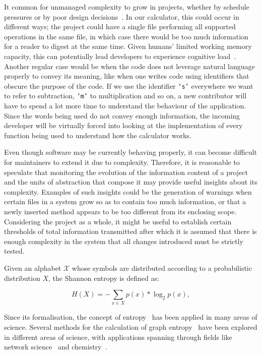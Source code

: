\documentclass[10pt,conference]{IEEEtran}
\begin{document}
It common for unmanaged complexity to grow in projects, whether by schedule pressures or by poor design decisions~\cite{mcconnel2018techdebt}. In our calculator, this could occur in different ways; the project could have a single file performing all supported operations in the same file, in which case there would be too much information for a reader to digest at the same time. Given humans' limited working memory capacity, this can potentially lead developers to experience cognitive load~\cite{kalyuga2011cognitive}. Another regular case would be when the code does not leverage natural language properly to convey its meaning, like when one writes code using identifiers that obscure the purpose of the code. If we use the identifier \texttt{`s'} everywhere we want to refer to subtraction, \texttt{`m'} to multiplication and so on, a new contributor will have to spend a lot more time to understand the behaviour of the application. Since the words being used do not convey enough information, the incoming developer will be virtually forced into looking at the implementation of every function being used to understand how the calculator works.

Even though software may be currently behaving properly, it can become difficult for maintainers to extend it due to complexity. Therefore, it is reasonable to speculate that monitoring the evolution of the information content of a project and the units of abstraction that compose it may provide useful insights about its complexity. Examples of such insights could be the generation of warnings when certain files in a system grow so as to contain too much information, or that a newly inserted method appears to be too different from its enclosing scope. Considering the project as a whole, it might be useful to establish certain thresholds of total information transmitted after which it is assumed that there is enough complexity in the system that all changes introduced must be strictly tested.

Given an alphabet $\mathcal{X}$ whose symbols are distributed according to a probabilistic distribution $X$, the Shannon entropy is defined as:

\begin{equation*}
H(X)= -\sum\limits_{x \in X} p(x)* \log_2 {p(x)},
\tag{1}\end{equation*}

Since its formalisation, the concept of entropy~\cite{shannon1948theory} has been applied in many areas of science. Several methods for the calculation of graph entropy~\cite{DEHMER201157history, dehmer2017mathematical} have been explored in different areas of science, with applications spanning through fields like network science~\cite{ephremides1998networks} and chemistry~\cite{Konstantinova2011chemistry, Huang536318}.
\end{document}
